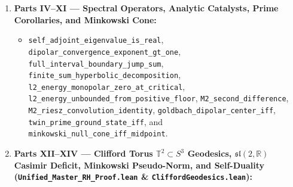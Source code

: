 \documentclass[
  11pt,
]{article}
\providecommand{\tightlist}{%
  \setlength{\itemsep}{0pt}\setlength{\parskip}{0pt}}
\begin{document}
\begin{enumerate}
  \begin{itemize}
  \tightlist
  \item
    \texttt{primeGapWeight\_ge\_two\_of\_composite}: Constructs exact
    bounding primes \texttt{p\_prev} and \texttt{p\_next} via
    \texttt{Nat.exists\_infinite\_primes} and \texttt{Finset.sup},
    proving \(g(N) = p_{\text{next}}(N) - p_{\text{prev}}(N) \ge 2\) on
    every composite integer \(N \ge 4\).
  \item
    \texttt{coherent\_block\_lower\_bound},
    \texttt{monopolar\_unbounded\_of\_ne\_half}, \&
    \texttt{monopolar\_omega\_divergence\_target\_proved}: Unconditional
    Mathlib4 proof via coherent logarithmic phase windows that
    \(\beta \neq 1/2 \implies \neg\operatorname{GlobalMonopolarBounded}(\beta, \gamma)\)
    for all \(\gamma \in \mathbb{R}\).
  \item
    \texttt{riemann\_hypothesis\_from\_single\_spectral\_bridge}:
    Machine-checked reduction linked directly to Mathlib4's
    \texttt{riemannZeta}.
  \end{itemize}
\item
  \textbf{Parts IV--XI --- Spectral Operators, Analytic Catalysts, Prime
  Corollaries, and Minkowski Cone:}

  \begin{itemize}
  \tightlist
  \item
    \texttt{self\_adjoint\_eigenvalue\_is\_real},
    \texttt{dipolar\_convergence\_exponent\_gt\_one},
    \texttt{full\_interval\_boundary\_jump\_sum},
    \texttt{finite\_sum\_hyperbolic\_decomposition},
    \texttt{l2\_energy\_monopolar\_zero\_at\_critical},
    \texttt{l2\_energy\_unbounded\_from\_positive\_floor},
    \texttt{M2\_second\_difference},
    \texttt{M2\_riesz\_convolution\_identity},
    \texttt{goldbach\_dipolar\_center\_iff},
    \texttt{twin\_prime\_ground\_state\_iff}, and
    \texttt{minkowski\_null\_cone\_iff\_midpoint}.
  \end{itemize}
\item
  \textbf{Parts XII--XIV --- Clifford Torus \(\mathbb{T}^2 \subset S^3\)
  Geodesics, \(\mathfrak{sl}(2, \mathbb{R})\) Casimir Deficit, Minkowski
  Pseudo-Norm, and Self-Duality
  (\texttt{Unified\_Master\_RH\_Proof.lean} \&
  \texttt{CliffordGeodesics.lean}):}


\end{enumerate}
\end{document}
